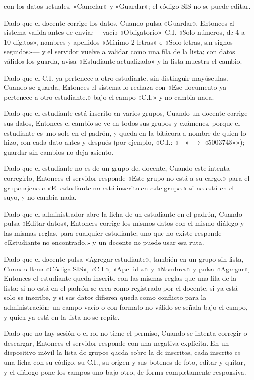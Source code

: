{      con los datos actuales, «Cancelar» y «Guardar»; el código SIS no se puede editar.
\item Dado que el docente corrige los datos, Cuando pulsa «Guardar», Entonces el sistema
      valida antes de enviar ---vacío «Obligatorio», C.I. «Solo números, de 4 a 10
      dígitos», nombres y apellidos «Mínimo 2 letras» o «Solo letras,
      sin signos seguidos»--- y el servidor vuelve a validar como una fila de la lista;
      con datos válidos los guarda, avisa «Estudiante actualizado» y la lista muestra el
      cambio.
\item Dado que el C.I. ya pertenece a otro estudiante, sin distinguir mayúsculas, Cuando
      se guarda, Entonces el sistema lo rechaza con «Ese documento ya pertenece a otro
      estudiante.» bajo el campo «C.I.» y no cambia nada.
\item Dado que el estudiante está inscrito en varios grupos, Cuando un docente corrige
      sus datos, Entonces el cambio se ve en todos sus grupos y exámenes, porque el
      estudiante es uno solo en el padrón, y queda en la bitácora a nombre de quien lo
      hizo, con cada dato antes y después (por ejemplo, «C.I.: «---» $\rightarrow$
      «5003748»»); guardar sin cambios no deja asiento.
\item Dado que el estudiante no es de un grupo del docente, Cuando este intenta
      corregirlo, Entonces el servidor responde «Este grupo no está a su cargo.» para el
      grupo ajeno o «El estudiante no está inscrito en este grupo.» si no está en el
      suyo, y no cambia nada.
\item Dado que el administrador abre la ficha de un estudiante en el padrón, Cuando
      pulsa «Editar datos», Entonces corrige los mismos datos con el mismo diálogo y las
      mismas reglas, para cualquier estudiante; uno que no existe responde «Estudiante
      no encontrado.» y un docente no puede usar esa ruta.
\item Dado que el docente pulsa «Agregar estudiante», también en un grupo sin lista,
      Cuando llena «Código SIS», «C.I.», «Apellidos» y «Nombres» y pulsa «Agregar»,
      Entonces el estudiante queda inscrito con las mismas reglas que una fila de la
      lista: si no está en el padrón se crea como registrado por el docente, si ya está
      solo se inscribe, y si sus datos difieren queda como conflicto para la
      administración; un campo vacío o con formato no válido se señala bajo el campo, y
      quien ya está en la lista no se repite.
\item Dado que no hay sesión o el rol no tiene el permiso, Cuando se intenta corregir o
      descargar, Entonces el servidor responde con una negativa explícita. En un
      dispositivo móvil la lista de grupos queda sobre la de inscritos, cada inscrito es
      una ficha con su código, su C.I., su origen y sus botones de foto, editar y
      quitar, y el diálogo pone los campos uno bajo otro, de forma completamente
      responsiva.}

